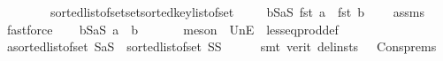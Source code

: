 \begin{isabellebody}
\ \ \ \ \ \ \ \ sorted{\isacharunderscore}{\kern0pt}list{\isacharunderscore}{\kern0pt}of{\isacharunderscore}{\kern0pt}set{\isachardot}{\kern0pt}set{\isacharunderscore}{\kern0pt}sorted{\isacharunderscore}{\kern0pt}key{\isacharunderscore}{\kern0pt}list{\isacharunderscore}{\kern0pt}of{\isacharunderscore}{\kern0pt}set{\isacharparenright}{\kern0pt}\ \isanewline
\ \ \isamarkupfalse%
\ {}{\isacharcolon}{\kern0pt}{\isachardoublequoteopen}{\isasymforall}b{\isasymin}{\isacharparenleft}{\kern0pt}S{}a{\isasymunion}S{}{\isacharparenright}{\kern0pt}{\isachardot}{\kern0pt}\ fst\ a\ {\isacharless}{\kern0pt}\ fst\ b{\isachardoublequoteclose}\ \isamarkupfalse%
\ {}\ {}\ assms{\isacharparenleft}{\kern0pt}{}{\isacharparenright}{\kern0pt}\ \isamarkupfalse%
\ fastforce\isanewline
\ \ \isamarkupfalse%
\ {\isachardoublequoteopen}{\isasymforall}b{\isasymin}{\isacharparenleft}{\kern0pt}S{}a{\isasymunion}S{}{\isacharparenright}{\kern0pt}{\isachardot}{\kern0pt}\ a\ {\isasymle}\ b{\isachardoublequoteclose}\ \isanewline
\ \ \ \ \isamarkupfalse%
\ {\isacharparenleft}{\kern0pt}meson\ {\isachardoublequoteopen}{}{\isachardoublequoteclose}\ UnE\ {}\ less{\isacharunderscore}{\kern0pt}eq{\isacharunderscore}{\kern0pt}prod{\isacharunderscore}{\kern0pt}def{\isacharparenright}{\kern0pt}\isanewline
\ \ \isamarkupfalse%
\ {}{}{\isacharcolon}{\kern0pt}{\isachardoublequoteopen}a{\isacharhash}{\kern0pt}sorted{\isacharunderscore}{\kern0pt}list{\isacharunderscore}{\kern0pt}of{\isacharunderscore}{\kern0pt}set\ {\isacharparenleft}{\kern0pt}S{}a{\isasymunion}S{}{\isacharparenright}{\kern0pt}\ {\isacharequal}{\kern0pt}\ sorted{\isacharunderscore}{\kern0pt}list{\isacharunderscore}{\kern0pt}of{\isacharunderscore}{\kern0pt}set\ {\isacharparenleft}{\kern0pt}S{}{\isasymunion}S{}{\isacharparenright}{\kern0pt}{\isachardoublequoteclose}\isanewline
\ \ \ \ \isamarkupfalse%
\ {\isacharparenleft}{\kern0pt}smt\ {\isacharparenleft}{\kern0pt}verit{\isacharcomma}{\kern0pt}\ del{\isacharunderscore}{\kern0pt}insts{\isacharparenright}{\kern0pt}\ {\isachardoublequoteopen}{}{\isachardoublequoteclose}\ {\isachardoublequoteopen}{}{\isachardoublequoteclose}\ Cons{\isachardot}{\kern0pt}prems{\isacharparenleft}{\kern0pt}{}{\isacharcomma}{\kern0pt}{}{\isacharparenright}{\kern0pt}\ {}\isanewline

\end{isabellebody}
